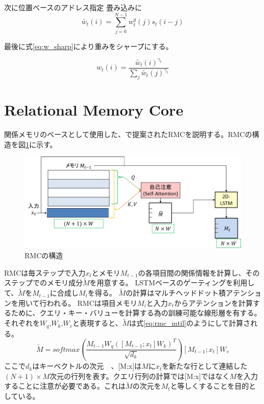 次に位置ベースのアドレス指定
畳み込みに
\begin{equation} \label{eq:w_shift}
	\tilde{w_t}(i) = \sum_{j=0}^{N-1}w^g_t(j)s_t(i-j)
\end{equation}

最後に式\ref{eq:w_sharp}により重みをシャープにする。

\begin{equation} \label{eq:w_sharp}
	w_t(i) = \frac{\tilde{w_t}(i)^{\gamma_t}}{\sum_j\tilde{w_t}(j)^{\gamma_t}}
\end{equation}


\section{Relational Memory Core}
関係メモリのベースとして使用した、\cite{rrnn}で提案されたRMCを説明する。RMCの構造を図\ref{fig:rmc}に示す。

\begin{figure}[t]
	\centering
	\includegraphics[width=\linewidth]{./figure/img_slide/rmc.png}
	\caption{RMCの構造}
	\label{fig:rmc}
\end{figure}

RMCは毎ステップで入力$x_t$とメモリ$M_{t-1}$の各項目間の関係情報を計算し、そのステップでのメモリ成分$\tilde{M}$を用意する。
LSTMベースのゲーティングを利用して、$\tilde{M}$を$M_{t-1}$に合成し$M_t$を得る。
$\tilde{M}$の計算はマルチヘッドドット積アテンション\cite{transformer}を用いて行われる。
RMCは項目メモリ$M_i$と入力$x_t$からアテンションを計算するために、クエリ・キー・バリューを計算する為の訓練可能な線形層を有する。
それぞれを$W_q$,$W_k$,$W_v$と表現すると、$\tilde{M}$は式\ref{eq:rmc_mtil}のようにして計算される。
\begin{equation} \label{eq:rmc_mtil}
	\tilde{M} =softmax ( \frac{M_{t-1}W_q ([M_{t-1};x_t]W_k)^T}{ \sqrt{d_k}} ) [M_{t-1};x_t]W_v
\end{equation}
ここで$d_k$はキーベクトルの次元　、[M;x]は$M$に$x_t$を新たな行として連結した$(N+1)\times M$次元の行列を表す。クエリ行列の計算では[M:x]ではなく$M$を入力することに注意が必要である。これは$\tilde{M}$の次元を$M_t$と等しくすることを目的としている。

